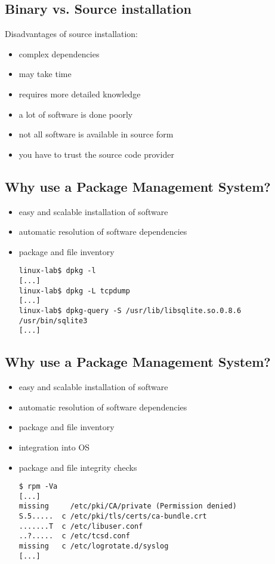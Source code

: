 \documentclass[xga]{xdvislides}
\begin{document}
\subsection{Binary vs. Source installation}
Disadvantages of source installation:
\begin{itemize}
	\item complex dependencies
	\item may take time
	\item requires more detailed knowledge
	\item a lot of software is done poorly
	\item not all software is available in source form
	\item you have to trust the source code provider
\end{itemize}


\subsection{Why use a Package Management System?}
\begin{itemize}
	\item easy and scalable installation of software
	\item automatic resolution of software dependencies
	\item package and file inventory \\
\begin{verbatim}
linux-lab$ dpkg -l
[...]
linux-lab$ dpkg -L tcpdump
[...]
linux-lab$ dpkg-query -S /usr/lib/libsqlite.so.0.8.6 /usr/bin/sqlite3
[...]

\end{verbatim}
\end{itemize}

\subsection{Why use a Package Management System?}
\begin{itemize}
	\item easy and scalable installation of software
	\item automatic resolution of software dependencies
	\item package and file inventory
	\item integration into OS
	\item package and file integrity checks \\
\begin{verbatim}
$ rpm -Va
[...]
missing     /etc/pki/CA/private (Permission denied)
S.5.....  c /etc/pki/tls/certs/ca-bundle.crt
.......T  c /etc/libuser.conf
..?.....  c /etc/tcsd.conf
missing   c /etc/logrotate.d/syslog
[...]
\end{verbatim}
\end{itemize}
\end{document}

